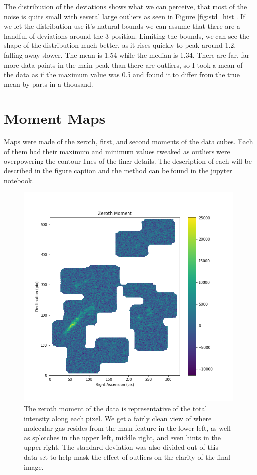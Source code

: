 \documentclass{article}
\begin{document}
The distribution of the deviations shows what we can perceive, that most of the noise is quite small with several large outliers as seen in Figure \ref{fig:std_hist}. If we let the distribution use it's natural bounds we can assume that there are a handful of deviations around the 3 position. Limiting the bounds, we can see the shape of the distribution much better, as it rises quickly to peak around 1.2, falling away slower. The mean is 1.54 while the median is 1.34. There are far, far more data points in the main peak than there are outliers, so I took a mean of the data as if the maximum value was 0.5 and found it to differ from the true mean by parts in a thousand.

\pagebreak

\section{Moment Maps}

Maps were made of the zeroth, first, and second moments of the data cubes. Each of them had their maximum and minimum values tweaked as outliers were overpowering the contour lines of the finer details. The description of each will be described in the figure caption and the method can be found in the jupyter notebook.

\begin{figure}[H]
    \centering
    \includegraphics[width=0.8\linewidth]{Photos/M_0.png}
    \caption{The zeroth moment of the data is representative of the total intensity along each pixel. We get a fairly clean view of where molecular gas resides from the main feature in the lower left, as well as splotches in the upper left, middle right, and even hints in the upper right. The standard deviation was also divided out of this data set to help mask the effect of outliers on the clarity of the final image.}
    \label{fig:M0}
\end{figure}
\end{document}
